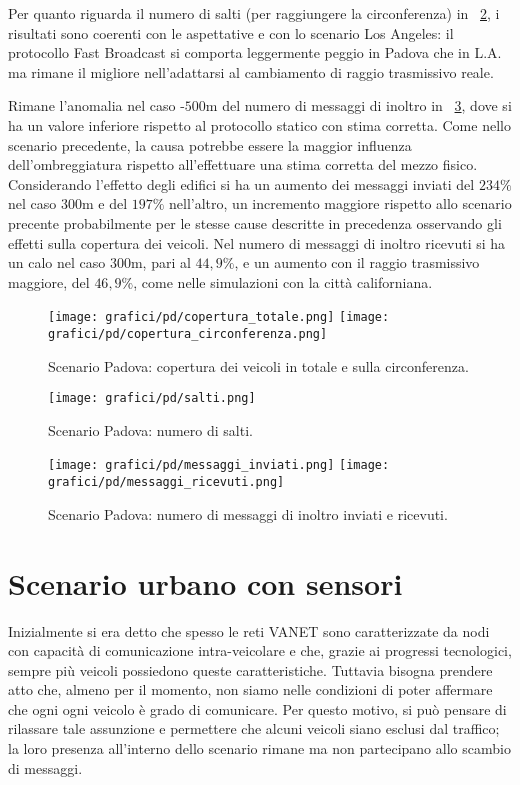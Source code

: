 Per quanto riguarda il numero di salti (per raggiungere la circonferenza) in \figurename~\ref{fig:risultati-padova-salti},
i risultati sono coerenti con le aspettative e con lo scenario Los Angeles:
il protocollo Fast Broadcast si comporta leggermente peggio in Padova che in L.A.
ma rimane il migliore nell'adattarsi al cambiamento di raggio trasmissivo reale.

Rimane l'anomalia nel caso \statica{}-$500$m del numero di messaggi di inoltro in \figurename~\ref{fig:risultati-padova-messaggi},
dove si ha un valore inferiore rispetto al protocollo statico con stima corretta.
Come nello scenario precedente, la causa potrebbe essere la maggior influenza dell'ombreggiatura rispetto
all'effettuare una stima corretta del mezzo fisico.
Considerando l'effetto degli edifici si ha un aumento dei messaggi inviati del $234\%$ nel caso $300$m e del $197\%$ nell'altro,
un incremento maggiore rispetto allo scenario precente probabilmente per le stesse cause
descritte in precedenza osservando gli effetti sulla copertura dei veicoli.
Nel numero di messaggi di inoltro ricevuti si ha un calo nel caso $300$m,
pari al $44,9\%$, e un aumento con il raggio trasmissivo maggiore, del $46,9\%$,
come nelle simulazioni con la città californiana.
%
\begin{figure}[htbp]
	\centering
		\texttt{[image: grafici/pd/copertura\_totale.png]}
		\texttt{[image: grafici/pd/copertura\_circonferenza.png]}
\caption{Scenario Padova: copertura dei veicoli in totale e sulla circonferenza.\label{fig:risultati-padova-copertura}}
\end{figure}
%
\begin{figure}[htbp]
	\centering
		\texttt{[image: grafici/pd/salti.png]}
\caption{Scenario Padova: numero di salti.\label{fig:risultati-padova-salti}}
\end{figure}
%
\begin{figure}[htbp]
	\centering
		\texttt{[image: grafici/pd/messaggi\_inviati.png]}
		\texttt{[image: grafici/pd/messaggi\_ricevuti.png]}
\caption{Scenario Padova: numero di messaggi di inoltro inviati e ricevuti.\label{fig:risultati-padova-messaggi}}
\end{figure}
\clearpage
%
%
\section{Scenario urbano con sensori}\label{sec:configurazione-sensori}
Inizialmente si era detto che spesso le reti VANET sono caratterizzate da nodi con capacità di comunicazione
intra-veicolare e che, grazie ai progressi tecnologici, sempre più veicoli possiedono queste caratteristiche.
Tuttavia bisogna prendere atto che, almeno per il momento, non siamo nelle condizioni
di poter affermare che ogni ogni veicolo è grado di comunicare.
Per questo motivo, si può pensare di rilassare tale assunzione e permettere che alcuni veicoli
siano esclusi dal traffico; la loro presenza all'interno dello scenario rimane ma non partecipano allo scambio di messaggi.

